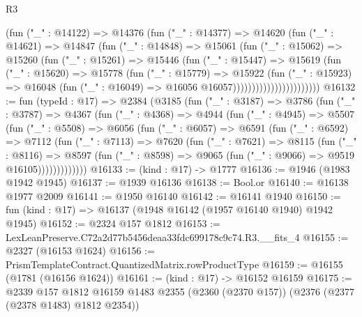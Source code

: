 \begin{lexlean}{R3}
\begin{coremodule}
                            (fun ("_" : @14122) =>
                            @14376
                              (fun ("_" : @14377) =>
                              @14620
                                (fun ("_" : @14621) =>
                                @14847
                                  (fun ("_" : @14848) =>
                                  @15061
                                    (fun ("_" : @15062) =>
                                    @15260
                                      (fun ("_" : @15261) =>
                                      @15446
                                        (fun ("_" : @15447) =>
                                        @15619
                                          (fun ("_" : @15620) =>
                                          @15778
                                            (fun ("_" : @15779) =>
                                            @15922
                                              (fun ("_" : @15923) =>
                                              @16048
                                                (fun ("_" : @16049) =>
                                                @16056 @16057)))))))))))))))))))))))
@16132 := fun (typeId : @17) =>
  @2384
    (@3185
      (fun ("_" : @3187) =>
      @3786
        (fun ("_" : @3787) =>
        @4367
          (fun ("_" : @4368) =>
          @4944
            (fun ("_" : @4945) =>
            @5507
              (fun ("_" : @5508) =>
              @6056
                (fun ("_" : @6057) =>
                @6591
                  (fun ("_" : @6592) =>
                  @7112
                    (fun ("_" : @7113) =>
                    @7620
                      (fun ("_" : @7621) =>
                      @8115
                        (fun ("_" : @8116) =>
                        @8597
                          (fun ("_" : @8598) =>
                          @9065 (fun ("_" : @9066) => @9519 @16105)))))))))))))
@16133 := (kind : @17) -> @1777
@16136 := @1946 (@1983 @1942 @1945)
@16137 := @1939 @16136
@16138 := Bool.or
@16140 := @16138 @1977 @2009
@16141 := @1950 @16140
@16142 := @16141 @1940
@16150 := fun (kind : @17) => @16137 (@1948 @16142 (@1957 @16140 @1940) @1942 @1945)
@16152 := @2324 @157 @1812
@16153 := LexLeanPreserve.C72a2d77b5456deaa33fdc699178c9c74.R3.__fits_4
@16155 := @2327 (@16153 @1624)
@16156 := PrismTemplateContract.QuantizedMatrix.rowProductType
@16159 := @16155 (@1781 (@16156 @1624))
@16161 := (kind : @17) -> @16152 @16159
@16175 := @2339
    @157
    @1812
    @16159
    @1483
    @2355
    (@2360 (@2370 @157))
    (@2376 (@2377 (@2378 @1483) @1812 @2354))

\end{coremodule}
\end{lexlean}
